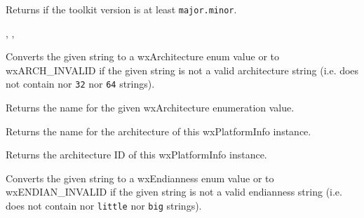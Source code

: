 \label{wxplatforminfochecktoolkitversion}


Returns \true if the toolkit version is at least \texttt{major.minor}.


,
,



\label{wxplatforminfogetarch}


Converts the given string to a wxArchitecture enum value or to
wxARCH\_INVALID if the given string is not a valid architecture string
(i.e. does not contain nor {\tt 32} nor {\tt 64} strings).


\label{wxplatforminfogetarchname}


Returns the name for the given wxArchitecture enumeration value.


Returns the name for the architecture of this wxPlatformInfo instance.


\label{wxplatforminfogetarchitecture}


Returns the architecture ID of this wxPlatformInfo instance.




\label{wxplatforminfogetendianness}


Converts the given string to a wxEndianness enum value or to
wxENDIAN\_INVALID if the given string is not a valid endianness string
(i.e. does not contain nor {\tt little} nor {\tt big} strings).


